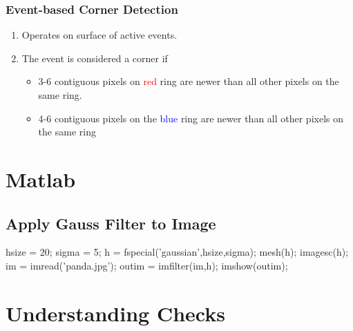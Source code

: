 \documentclass[10pt,a4paper]{scrartcl}
\begin{document}
\begin{multicols*}{2}
\subsubsection{Event-based Corner Detection}


\begin{enumerate}
\item Operates on surface of active events.
\item The event is considered a corner if
\begin{itemize}
\item 3-6 contiguous pixels on \textcolor{red}{red} ring are newer than all other pixels on the same ring.
\item 4-6 contiguous pixels on the \textcolor{blue}{blue} ring are newer than all other pixels on the same ring
\end{itemize}
\end{enumerate}

\section{Matlab}

\subsection{Apply Gauss Filter to Image}

\begin{TPMatlab}
hsize = 20;
sigma = 5;
h = fspecial('gaussian',hsize,sigma);
mesh(h); %
imagesc(h); %
im = imread('panda.jpg');
outim = imfilter(im,h);
imshow(outim);
\end{TPMatlab}

\section*{Understanding Checks}

{

\begin{itemize}
}
{
\end{itemize}
\vspace{3ex}
}



\end{multicols*}
\end{document}
